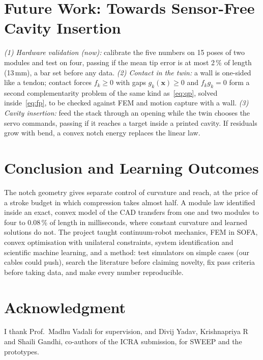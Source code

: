 \documentclass[conference]{IEEEtran}
\begin{document}
\section{Future Work: Towards Sensor-Free Cavity Insertion}\label{sec:future}
\emph{(1) Hardware validation (now):} calibrate the five numbers on 15 poses of two modules and test on four, passing if
the mean tip error is at most 2\,\% of length (13\,mm), a bar set before any data. \emph{(2) Contact in the twin:} a
wall is one-sided like a tendon; contact forces $f_k\ge0$ with gaps $g_k(\bm x)\ge0$ and $f_kg_k=0$ form a second
complementarity problem of the same kind as~\eqref{eq:qp}, solved inside~\eqref{eq:fp}, to be checked against FEM and
motion capture with a wall. \emph{(3) Cavity insertion:} feed the stack through an opening while the twin chooses the
servo commands, passing if it reaches a target inside a printed cavity. If residuals grow with bend, a convex notch energy replaces the linear law.

\section{Conclusion and Learning Outcomes}
The notch geometry gives separate control of curvature and reach, at the price of a stroke budget in which compression
takes almost half. A module law identified inside an exact, convex model of the CAD transfers from one and two modules
to four to 0.08\,\% of length in milliseconds, where constant curvature and learned solutions do not. The project taught
continuum-robot mechanics, FEM in SOFA, convex optimisation with unilateral constraints, system identification and
scientific machine learning, and a method: test simulators on simple cases (our cables could push), search the
literature before claiming novelty, fix pass criteria before taking data, and make every number reproducible.

\section*{Acknowledgment}
I thank Prof.\ Madhu Vadali for supervision, and Divij Yadav, Krishnapriya R and Shaili Gandhi, co-authors of the ICRA
submission, for SWEEP and the prototypes.
\end{document}
